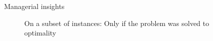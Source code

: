 \documentclass[utf8,aspectratio=169,ngerman,english]{beamer}
\begin{document}
\begin{frame}{Managerial insights}
    \begin{figure}
        \begin{minipage}[r]{.48\linewidth}
        \end{minipage}
        \hfill
        \begin{minipage}[l]{.48\linewidth}
        \end{minipage}
        \label{fig:manage}
        \caption{On a subset of instances: Only if the problem was solved to optimality}
    \end{figure}
\end{frame}
\end{document}
